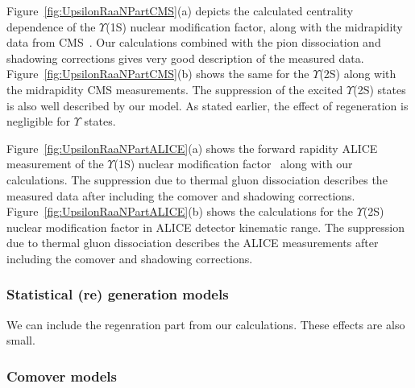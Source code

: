 \documentclass[review]{elsarticle}
\begin{document}
{Figure~\ref{fig:UpsilonRaaNPartCMS}(a) depicts the calculated 
centrality dependence of the $\Upsilon$(1S) nuclear
modification factor, along with the midrapidity data from CMS~\cite{Sirunyan:2018nsz}.
Our calculations combined with the pion dissociation and shadowing corrections 
gives very good description of the measured data. Figure~\ref{fig:UpsilonRaaNPartCMS}(b)
shows the same for the $\Upsilon$(2S) along with the midrapidity
CMS measurements. The suppression of the excited $\Upsilon$(2S) states 
is also well described by our model. As stated earlier, the effect of regeneration is
negligible for $\Upsilon$ states. 

Figure~\ref{fig:UpsilonRaaNPartALICE}(a) shows the forward rapidity ALICE
measurement of the $\Upsilon$(1S) nuclear modification factor~\cite{ALICE:Y5TeV}
along with our calculations. The suppression due to thermal gluon dissociation 
describes the measured data after including the comover and shadowing corrections.
Figure~\ref{fig:UpsilonRaaNPartALICE}(b) shows the calculations for the
$\Upsilon$(2S) nuclear modification factor in ALICE detector kinematic range.
The suppression due to thermal gluon dissociation describes the
ALICE measurements after including the comover and shadowing corrections.
















  \subsubsection{Statistical (re) generation models}
  {\color{red} We can include the regenration part from our calculations. These effects are also small.}



\subsubsection{Comover models}

}
\end{document}
